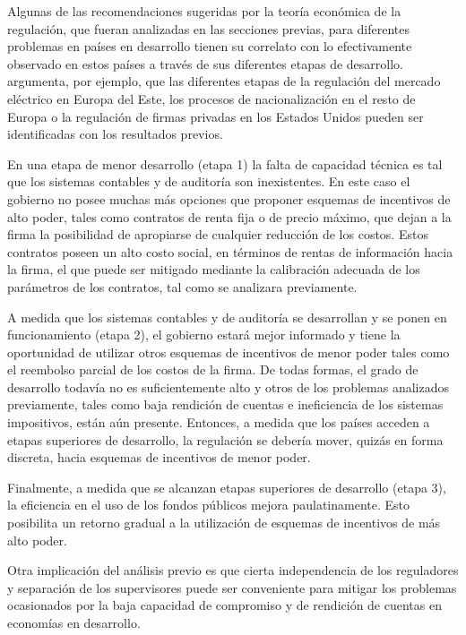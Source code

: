 \documentclass[
  12pt,
  spanish,
]{book}
\begin{document}
Algunas de las recomendaciones sugeridas por la teoría económica de la regulación, que fueran analizadas en las secciones previas, para diferentes problemas en países en desarrollo tienen su correlato con lo efectivamente observado en estos países a través de sus diferentes etapas de desarrollo. \citet{Laffont2005} argumenta, por ejemplo, que las diferentes etapas de la regulación del mercado eléctrico en Europa del Este, los procesos de nacionalización en el resto de Europa o la regulación de firmas privadas en los Estados Unidos pueden ser identificadas con los resultados previos.

En una etapa de menor desarrollo (etapa 1) la falta de capacidad técnica es tal que los sistemas contables y de auditoría son inexistentes. En este caso el gobierno no posee muchas más opciones que proponer esquemas de incentivos de alto poder, tales como contratos de renta fija o de precio máximo, que dejan a la firma la posibilidad de apropiarse de cualquier reducción de los costos. Estos contratos poseen un alto costo social, en términos de rentas de información hacia la firma, el que puede ser mitigado mediante la calibración adecuada de los parámetros de los contratos, tal como se analizara previamente.

A medida que los sistemas contables y de auditoría se desarrollan y se ponen en funcionamiento (etapa 2), el gobierno estará mejor informado y tiene la oportunidad de utilizar otros esquemas de incentivos de menor poder tales como el reembolso parcial de los costos de la firma. De todas formas, el grado de desarrollo todavía no es suficientemente alto y otros de los problemas analizados previamente, tales como baja rendición de cuentas e ineficiencia de los sistemas impositivos, están aún presente. Entonces, a medida que los países acceden a etapas superiores de desarrollo, la regulación se debería mover, quizás en forma discreta, hacia esquemas de incentivos de menor poder.

Finalmente, a medida que se alcanzan etapas superiores de desarrollo (etapa 3), la eficiencia en el uso de los fondos públicos mejora paulatinamente. Esto posibilita un retorno gradual a la utilización de esquemas de incentivos de más alto poder.

Otra implicación del análisis previo es que cierta independencia de los reguladores y separación de los supervisores puede ser conveniente para mitigar los problemas ocasionados por la baja capacidad de compromiso y de rendición de cuentas en economías en desarrollo.
\end{document}
